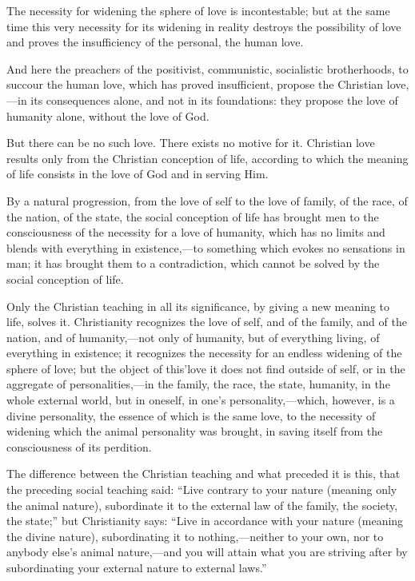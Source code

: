 \documentclass{book}
\begin{document}
The necessity for widening the sphere of love is incontestable; but at the same time this very necessity for its widening in reality destroys the possibility of love and proves the insufficiency of the personal, the human love.

And here the preachers of the positivist, communistic, socialistic brotherhoods, to succour the human love, which has proved insufficient, propose the Christian love,—in its consequences alone, and not in its foundations: they propose the love of humanity alone, without the love of God.

But there can be no such love. There exists no motive for it. Christian love results only from the Christian conception of life, according to which the meaning of life consists in the love of God and in serving Him.

By a natural progression, from the love of self to the love of family, of the race, of the nation, of the state, the social conception of life has brought men to the consciousness of the necessity for a love of humanity, which has no limits and blends with everything in existence,—to something which evokes no sensations in man; it has brought them to a contradiction, which cannot be solved by the social conception of life.

Only the Christian teaching in all its significance, by giving a new meaning to life, solves it. Christianity recognizes the love of self, and of the family, and of the nation, and of humanity,—not only of humanity, but of everything living, of everything in existence; it recognizes the necessity for an endless widening of the sphere of love; but the object of this’love it does not find outside of self, or in the aggregate of personalities,—in the family, the race, the state, humanity, in the whole external world, but in oneself, in one’s personality,—which, however, is a divine personality, the essence of which is the same love, to the necessity of widening which the animal personality was brought, in saving itself from the consciousness of its perdition.

The difference between the Christian teaching and what preceded it is this, that the preceding social teaching said: “Live contrary to your nature (meaning only the animal nature), subordinate it to the external law of the family, the society, the state;” but Christianity says: “Live in accordance with your nature (meaning the divine nature), subordinating it to nothing,—neither to your own, nor to anybody else’s animal nature,—and you will attain what you are striving after by subordinating your external nature to external laws.”
\end{document}

